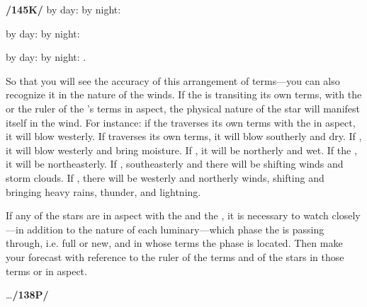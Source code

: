 \Taurus\xspace \Virgo\xspace \textbf{/145K/} \Capricorn\xspace
by day: \Venus\xspace \Moon\xspace \Saturn\xspace \Mercury\xspace \Mars\xspace \Sun\xspace \Jupiter\xspace
by night: \Moon\xspace \Venus\xspace \Mercury\xspace \Saturn\xspace \Mars\xspace \Jupiter\xspace \Sun\xspace

\Gemini\xspace \Libra\xspace \Aquarius\xspace by day: \Saturn\xspace \Mercury\xspace \Mars\xspace \Sun\xspace \Jupiter\xspace \Venus\xspace \Moon\xspace by night: \Mercury\xspace \Saturn\xspace \Mars\xspace \Jupiter\xspace \Sun\xspace \Moon\xspace \Venus\xspace

\Cancer\xspace \Scorpio\xspace \Pisces\xspace by day: \Mars\xspace \Sun\xspace \Jupiter\xspace \Venus\xspace \Moon\xspace \Saturn\xspace \Mercury\xspace by night: \Mars\xspace \Jupiter\xspace \Sun\xspace \Moon\xspace \Venus\xspace \Mercury\xspace \Saturn.

So that you will see the accuracy of this arrangement of terms—you can also recognize it in the nature of the winds. If the \Sun\xspace is transiting its own terms, with the \Moon\xspace or the ruler of the \Moon’s terms in aspect, the physical nature of the star will manifest itself in the wind. For instance: if the \Sun\xspace traverses its own terms with the \Moon\xspace in aspect, it will blow westerly. If \Venus\xspace traverses its own terms, it will blow southerly and dry. If \Saturn, it will blow westerly and bring moisture. If \Jupiter, it will be northerly and wet. If the \Moon, it will be northeasterly. If \Venus, southeasterly and there will be shifting winds and storm clouds. If \Mercury, there will be westerly and northerly winds, shifting and bringing heavy rains, thunder, and lightning. 

If any of the stars are in aspect with the \Sun\xspace and the \Moon, it is necessary to watch closely—in addition to the nature of each luminary—which phase the \Moon\xspace is passing through, i.e. full or new, and in whose terms the phase is located. Then make your forecast with reference to the ruler of the terms and of the stars in those terms or in aspect.

\ldots \textbf{/138P/}
\newpage
